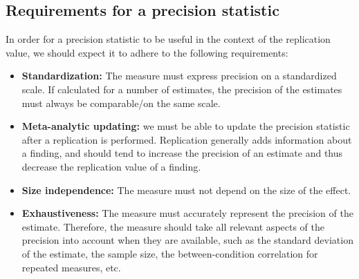 \documentclass[]{article}
\begin{document}
\hypertarget{requirements-for-a-precision-statistic}{%
\subsection{Requirements for a precision
statistic}\label{requirements-for-a-precision-statistic}}

In order for a precision statistic to be useful in the context of the
replication value, we should expect it to adhere to the following
requirements:

\begin{itemize}
\item
  \textbf{Standardization:} The measure must express precision on a
  standardized scale. If calculated for a number of estimates, the
  precision of the estimates must always be comparable/on the same
  scale.
\item
  \textbf{Meta-analytic updating:} we must be able to update the
  precision statistic after a replication is performed. Replication
  generally adds information about a finding, and should tend to
  increase the precision of an estimate and thus decrease the
  replication value of a finding.
\item
  \textbf{Size independence:} The measure must not depend on the size of
  the effect.
\item
  \textbf{Exhaustiveness:} The measure must accurately represent the
  precision of the estimate. Therefore, the measure should take all
  relevant aspects of the precision into account when they are
  available, such as the standard deviation of the estimate, the sample
  size, the between-condition correlation for repeated measures, etc.
\end{itemize}
\end{document}
